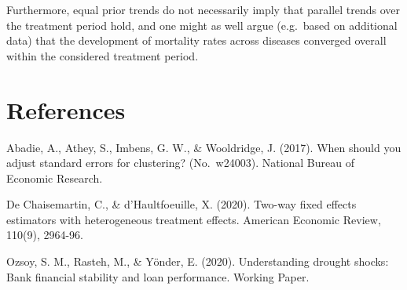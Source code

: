 \documentclass[
]{article}
\begin{document}
Furthermore, equal prior trends do not necessarily imply that parallel
trends over the treatment period hold, and one might as well argue
(e.g.~based on additional data) that the development of mortality rates
across diseases converged overall within the considered treatment
period.

\hypertarget{references}{%
\section{References}\label{references}}

Abadie, A., Athey, S., Imbens, G. W., \& Wooldridge, J. (2017). When
should you adjust standard errors for clustering? (No.~w24003). National
Bureau of Economic Research.

De Chaisemartin, C., \& d'Haultfoeuille, X. (2020). Two-way fixed
effects estimators with heterogeneous treatment effects. American
Economic Review, 110(9), 2964-96.

Ozsoy, S. M., Rasteh, M., \& Yönder, E. (2020). Understanding drought
shocks: Bank financial stability and loan performance. Working Paper.
\end{document}
